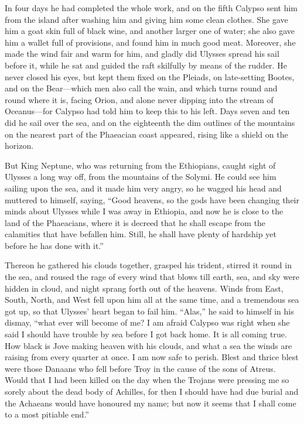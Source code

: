 In four days he had completed the whole work, and on the fifth Calypso sent him
from the island after washing him and giving him some clean clothes. She gave
him a goat skin full of black wine, and another larger one of water; she also
gave him a wallet full of provisions, and found him in much good meat.
Moreover, she made the wind fair and warm for him, and gladly did Ulysses
spread his sail before it, while he sat and guided the raft skilfully by means
of the rudder. He never closed his eyes, but kept them fixed on the Pleiads, on
late-setting Bootes, and on the Bear—which men also call the wain, and which
turns round and round where it is, facing Orion, and alone never dipping into
the stream of Oceanus—for Calypso had told him to keep this to his left. Days
seven and ten did he sail over the sea, and on the eighteenth the dim outlines
of the mountains on the nearest part of the Phaeacian coast appeared, rising
like a shield on the horizon.

But King Neptune, who was returning from the Ethiopians, caught sight of
Ulysses a long way off, from the mountains of the Solymi. He could see him
sailing upon the sea, and it made him very angry, so he wagged his head and
muttered to himself, saying, “Good heavens, so the gods have been changing
their minds about Ulysses while I was away in Ethiopia, and now he is close to
the land of the Phaeacians, where it is decreed that he shall escape from the
calamities that have befallen him. Still, he shall have plenty of hardship yet
before he has done with it.”

Thereon he gathered his clouds together, grasped his trident, stirred it round
in the sea, and roused the rage of every wind that blows till earth, sea, and
sky were hidden in cloud, and night sprang forth out of the heavens. Winds from
East, South, North, and West fell upon him all at the same time, and a
tremendous sea got up, so that Ulysses’ heart began to fail him. “Alas,” he
said to himself in his dismay, “what ever will become of me? I am afraid
Calypso was right when she said I should have trouble by sea before I got back
home. It is all coming true. How black is Jove making heaven with his clouds,
and what a sea the winds are raising from every quarter at once. I am now safe
to perish. Blest and thrice blest were those Danaans who fell before Troy in
the cause of the sons of Atreus. Would that I had been killed on the day when
the Trojans were pressing me so sorely about the dead body of Achilles, for
then I should have had due burial and the Achaeans would have honoured my name;
but now it seems that I shall come to a most pitiable end.”

